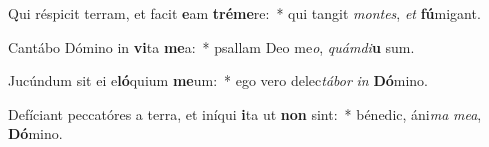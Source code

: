 \item Qui réspicit terram, et facit \textbf{e}am \textbf{tré}\textbf{me}re:~* qui tangit \textit{mon}\textit{tes}, \textit{et} \textbf{fú}migant.
\item Cantábo Dómino in \textbf{vi}ta \textbf{me}a:~* psallam Deo me\textit{o}, \textit{quám}\textit{di}\textbf{u} sum.
\item Jucúndum sit ei e\textbf{ló}quium \textbf{me}um:~* ego vero delec\textit{tá}\textit{bor} \textit{in} \textbf{Dó}mino.
\item Defíciant peccatóres a terra, et iníqui \textbf{i}ta ut \textbf{non} sint:~* bénedic, áni\textit{ma} \textit{me}\textit{a}, \textbf{Dó}mino.

